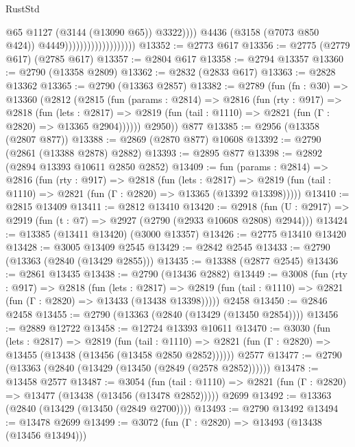 \begin{lexlean}{RustStd}
\begin{coremodule}
                                                  @65
                                                  @1127
                                                  (@3144 (@13090 @65))
                                                  @3322))))
                                          @4436
                                          (@3158 (@7073 @850 @424))
                                          @4449)))))))))))))))))))
@13352 := @2773 @617
@13356 := @2775 (@2779 @617) (@2785 @617)
@13357 := @2804 @617
@13358 := @2794 @13357
@13360 := @2790 (@13358 @2809)
@13362 := @2832 (@2833 @617)
@13363 := @2828 @13362
@13365 := @2790 (@13363 @2857)
@13382 := @2789
    (fun (fn : @30) =>
    @13360
      (@2812
        (@2815
          (fun (params : @2814) =>
          @2816
            (fun (rty : @917) =>
            @2818
              (fun (lets : @2817) =>
              @2819 (fun (tail : @1110) => @2821 (fun (Γ : @2820) => @13365 @2904))))))
        @2950))
    @877
@13385 := @2956 (@13358 (@2807 @877))
@13388 := @2869 (@2870 @877) @10608
@13392 := @2790 (@2861 (@13388 @2878) @2882)
@13393 := @2895 @877
@13398 := @2892 (@2894 @13393 @10611 @2850 @2852)
@13409 := fun (params : @2814) =>
  @2816
    (fun (rty : @917) =>
    @2818
      (fun (lets : @2817) =>
      @2819 (fun (tail : @1110) => @2821 (fun (Γ : @2820) => @13365 (@13392 @13398)))))
@13410 := @2815 @13409
@13411 := @2812 @13410
@13420 := @2918
    (fun (U : @2917) => @2919 (fun (t : @7) => @2927 (@2790 (@2933 @10608 @2808) @2944)))
@13424 := @13385 (@13411 @13420) (@3000 @13357)
@13426 := @2775 @13410 @13420
@13428 := @3005 @13409 @2545
@13429 := @2842 @2545
@13433 := @2790 (@13363 (@2840 (@13429 @2855)))
@13435 := @13388 (@2877 @2545)
@13436 := @2861 @13435
@13438 := @2790 (@13436 @2882)
@13449 := @3008
    (fun (rty : @917) =>
    @2818
      (fun (lets : @2817) =>
      @2819 (fun (tail : @1110) => @2821 (fun (Γ : @2820) => @13433 (@13438 @13398)))))
    @2458
@13450 := @2846 @2458
@13455 := @2790 (@13363 (@2840 (@13429 (@13450 @2854))))
@13456 := @2889 @12722
@13458 := @12724 @13393 @10611
@13470 := @3030
    (fun (lets : @2817) =>
    @2819
      (fun (tail : @1110) =>
      @2821 (fun (Γ : @2820) => @13455 (@13438 (@13456 (@13458 @2850 @2852))))))
    @2577
@13477 := @2790 (@13363 (@2840 (@13429 (@13450 (@2849 (@2578 @2852))))))
@13478 := @13458 @2577
@13487 := @3054
    (fun (tail : @1110) => @2821 (fun (Γ : @2820) => @13477 (@13438 (@13456 (@13478 @2852)))))
    @2699
@13492 := @13363 (@2840 (@13429 (@13450 (@2849 @2700))))
@13493 := @2790 @13492
@13494 := @13478 @2699
@13499 := @3072 (fun (Γ : @2820) => @13493 (@13438 (@13456 @13494)))

\end{coremodule}
\end{lexlean}
